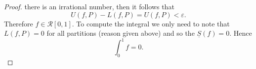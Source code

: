 \documentclass[12pt]{article}
\begin{document}
\begin{enumerate}
\begin{proof}
                there is an irrational number, then it follows that 
                \begin{equation*}
                    U(f, P)-L(f, P)=U(f, P)<\varepsilon.
                \end{equation*}
                Therefore $f\in\mathcal{R}[0, 1]$. To compute the integral we
                only need to note that $L(f, P)=0$ for all partitions (reason
                given above) and so the $\underline{S}(f)=0$. Hence
                \begin{equation*}
                    \int_{0}^1f=0.
                \end{equation*}
           \end{proof}
    \end{enumerate}
\end{document}
